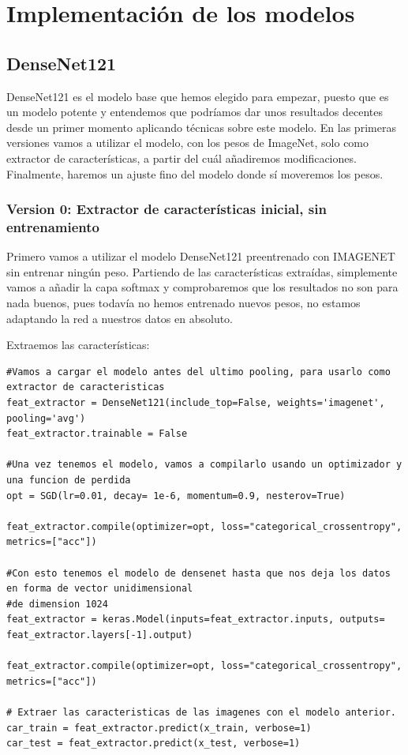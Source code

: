 \documentclass[11pt,a4paper]{article}
\theoremstyle{definition}
\begin{document}
\section{Implementación de los modelos}

\subsection{DenseNet121}

DenseNet121 es el modelo base que hemos elegido para empezar, puesto que es un modelo potente y entendemos que podríamos dar unos resultados decentes desde un primer momento aplicando técnicas sobre este modelo. En las primeras versiones vamos a utilizar el modelo, con los pesos de ImageNet, solo como extractor de características, a partir del cuál añadiremos modificaciones. Finalmente, haremos un ajuste fino del modelo donde sí moveremos los pesos.

\subsubsection{Version 0: Extractor de características inicial, sin entrenamiento}

Primero vamos a utilizar el modelo DenseNet121 preentrenado con IMAGENET sin entrenar ningún peso. Partiendo de las características extraídas, simplemente vamos a añadir la capa softmax y comprobaremos que los resultados no son para nada buenos, pues todavía no hemos entrenado nuevos pesos, no estamos adaptando la red a nuestros datos en absoluto.

Extraemos las características:

\begin{lstlisting}
#Vamos a cargar el modelo antes del ultimo pooling, para usarlo como extractor de caracteristicas
feat_extractor = DenseNet121(include_top=False, weights='imagenet', pooling='avg')
feat_extractor.trainable = False

#Una vez tenemos el modelo, vamos a compilarlo usando un optimizador y una funcion de perdida
opt = SGD(lr=0.01, decay= 1e-6, momentum=0.9, nesterov=True)

feat_extractor.compile(optimizer=opt, loss="categorical_crossentropy", metrics=["acc"])

#Con esto tenemos el modelo de densenet hasta que nos deja los datos en forma de vector unidimensional
#de dimension 1024
feat_extractor = keras.Model(inputs=feat_extractor.inputs, outputs= feat_extractor.layers[-1].output)

feat_extractor.compile(optimizer=opt, loss="categorical_crossentropy", metrics=["acc"])

# Extraer las caracteristicas de las imagenes con el modelo anterior.
car_train = feat_extractor.predict(x_train, verbose=1)
car_test = feat_extractor.predict(x_test, verbose=1)
\end{lstlisting}
\end{document}
